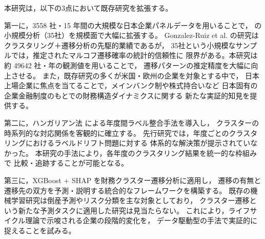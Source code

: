 本研究は，以下の3点において既存研究を拡張する。

第一に，\num{3558} 社・15 年間の大規模な日本企業パネルデータを用いることで，
 の小規模分析（35社）を規模面で大幅に拡張する。
Gonzalez-Ruiz et al. の研究はクラスタリング＋遷移分析の先駆的業績であるが，
35社という小規模なサンプルでは，推定されたマルコフ遷移確率の統計的信頼性に
限界がある。本研究は約 \num{49642} 社・年の観測値を用いることで，
遷移パターンの推定精度を大幅に向上させる。
また，既存研究の多くが米国・欧州の企業を対象とする中で，
日本上場企業に焦点を当てることで，メインバンク制や株式持合いなど
日本固有の企業金融制度のもとでの財務構造ダイナミクスに関する
新たな実証的知見を提供する。

第二に，ハンガリアン法 \citep{Kuhn1955} による年度間ラベル整合手法を導入し，
クラスターの時系列的な対応関係を客観的に確立する。
先行研究では，年度ごとのクラスタリングにおけるラベルドリフト問題に対する
体系的な解決策が提示されていなかった。
本研究の手法により，各年度のクラスタリング結果を統一的な枠組みで
比較・追跡することが可能となる。

第三に，XGBoost + SHAP を財務クラスター遷移分析に適用し，
遷移の有無と遷移先の双方を予測・説明する統合的なフレームワークを構築する。
既存の機械学習研究は倒産予測やリスク分類を主な対象としており，
クラスター遷移という新たな予測タスクに適用した研究は見当たらない。
これにより，ライフサイクル理論で示唆される企業の段階的変化を，
データ駆動型の手法で実証的に捉えることを試みる。
